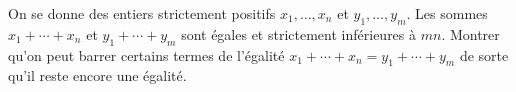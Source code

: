 On se donne des entiers strictement positifs $x_1, \ldots, x_n$ et $y_1, \ldots, y_m$. Les sommes $x_1 + \cdots + x_n$ et $y_1 + \cdots + y_m$ sont égales et strictement inférieures à $mn$. Montrer qu'on peut barrer certains termes de l'égalité $x_1 + \cdots + x_n = y_1 + \cdots + y_m$ de sorte qu'il reste encore une égalité.

